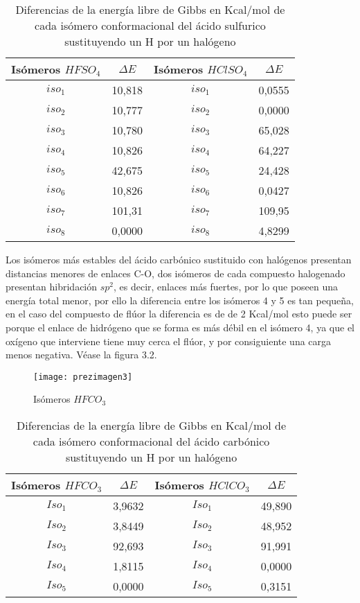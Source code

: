 \begin{table}[H]
	\begin{center}
		\begin{tabular}{|c|c|c|c|}
			\hline
			Isómeros $HFSO_4$ & $\Delta E$ & Isómeros $HClSO_4$ & $\Delta E$ \\ \hline
			$iso_1$	& 10,818 & $iso_1$ & 0,0555 \\ \hline
			$iso_2$ & 10,777 & $iso_2$ & 0,0000 \\ \hline
			$iso_3$ & 10,780 & $iso_3$ & 65,028 \\ \hline
			$iso_4$ & 10,826 & $iso_4$ & 64,227 \\ \hline
			$iso_5$ & 42,675 & $iso_5$ & 24,428 \\ \hline
			$iso_6$ & 10,826 & $iso_6$ & 0,0427 \\ \hline
			$iso_7$ &	101,31 & $iso_7$ & 109,95 \\ \hline
			$iso_8$ &	0,0000 & $iso_8$ & 4,8299 \\ \hline
		\end{tabular}
		\caption{Diferencias de la energía libre de Gibbs en Kcal/mol de cada isómero conformacional del ácido sulfurico sustituyendo un H por un halógeno}
	\end{center}
\end{table}

Los isómeros más estables del ácido carbónico sustituido con halógenos presentan distancias menores de enlaces C-O, dos isómeros de cada compuesto halogenado presentan hibridación $sp^2$, es decir, enlaces más fuertes, por lo que poseen una energía total menor, por ello la diferencia entre los isómeros 4 y 5 es tan pequeña, en el caso del compuesto de flúor la diferencia es de de 2 Kcal/mol esto puede ser porque el enlace de hidrógeno que se forma es más débil en el isómero 4, ya que el oxígeno que interviene tiene muy cerca el flúor, y por consiguiente una carga menos negativa. Véase la figura 3.2.

\begin{figure}[H]
	\centering
	\texttt{[image: prezimagen3]}
	\caption{Isómeros $HFCO_3$}
\end{figure} 

\begin{table}[H]
	\begin{center}
		\begin{tabular}{|c|c|c|c|}
			\hline 
			Isómeros $HFCO_3$ & $\Delta E$ & Isómeros $HClCO_3$& $\Delta E$ \\ \hline
			$Iso_1$ & 3,9632 & $Iso_1$ & 49,890 \\ \hline
			$Iso_2$ & 3,8449 & $Iso_2$ & 48,952 \\ \hline
			$Iso_3$ & 92,693 & $Iso_3$ & 91,991 \\ \hline
			$Iso_4$ & 1,8115 & $Iso_4$ & 0,0000 \\ \hline
			$Iso_5$ & 0,0000 & $Iso_5$ & 0,3151 \\ \hline
		\end{tabular}
		\caption{Diferencias de la energía libre de Gibbs en Kcal/mol de cada isómero conformacional del ácido carbónico sustituyendo un H por un halógeno}
	\end{center}
\end{table}

